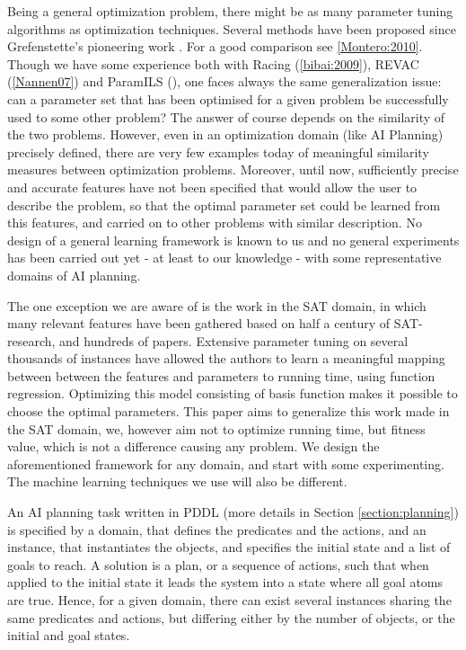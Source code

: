 \documentclass{article}
\begin{document}
Being a general optimization problem, there might be as many parameter tuning algorithms as optimization techniques. Several methods have been proposed  since Grefenstette's pioneering work \cite{Grefenstette86}. For a good comparison see \ref{Montero:2010}. Though we have some experience both with Racing (\ref{bibai:2009}), REVAC (\ref{Nannen07}) and ParamILS (\cite{ParamILS-JAIR}), one faces always the same generalization issue: can a parameter set that has been optimised for a given problem be successfully used to some other problem? The answer of course depends on the similarity of the two problems. However, even in an optimization domain (like AI Planning) precisely defined, there are very few examples today of meaningful similarity measures between optimization problems. Moreover, until now, sufficiently precise and accurate features have not been specified that would allow the user to describe the problem, so that the optimal parameter set could be learned from this features, and carried on to other problems with similar description. No design of a general learning framework is known to us and no general experiments has been carried out yet - at least to our knowledge - with some representative domains of AI planning.

The one exception we are aware of is the work \cite{Hutter06} in the SAT domain, in which many relevant features have been gathered based on half a century of SAT-research, and hundreds of papers. Extensive parameter tuning on several thousands of instances have allowed the authors to learn a meaningful mapping between between the features and parameters to running time, using function regression. Optimizing this model consisting of basis function makes it possible to choose the optimal parameters. This paper aims to generalize this work made in the SAT domain, we, however aim not to optimize running time, but fitness value, which is not a difference causing any problem. We design the aforementioned framework for any domain, and start with some experimenting. The machine learning techniques we use will also be different.

An AI planning task written in PDDL (more details in Section \ref{section:planning}) is specified by a domain, that defines the predicates and the actions, and an instance, that instantiates the objects, and specifies the initial state and a list of goals to reach. A solution is a plan, or a sequence of actions, such that when applied to the initial state it leads the system into a state where all goal atoms are true. Hence, for a given domain, there can exist several instances sharing the same predicates and actions, but differing either by the number of objects, or the initial and goal states. 
\end{document}
